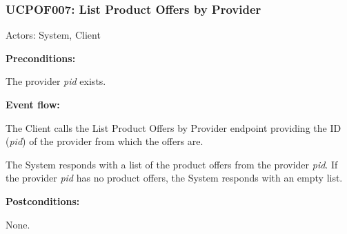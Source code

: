 \begin{ucbox}{\subsubsection{UCPOF007: List Product Offers by Provider}}
\label{UCPOF007}

Actors: System, Client

\textbf{Preconditions:}

\ucitem The provider \textit{pid} exists.

\textbf{Event flow:}

\ucitem The Client calls the List Product Offers by Provider endpoint providing the ID (\textit{pid}) of the provider from which the offers are.

\ucitem The System responds with a list of the product offers from the provider \textit{pid}. If the provider \textit{pid} has no product offers, the System responds with an empty list.

\textbf{Postconditions:}

\ucitem None.

\end{ucbox}

\newpage